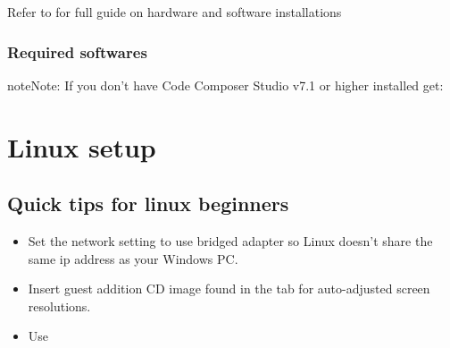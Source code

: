 \documentclass[letterpaper,10pt,english]{sphinxmanual}
\begin{document}
Refer to  for full guide on hardware and software installations


\subsubsection{Required softwares}
\label{\detokenize{Radar information:required-softwares}}




\begin{sphinxadmonition}{note}{Note:}
If you don’t have Code Composer Studio v7.1 or higher installed get:
\end{sphinxadmonition}



\section{Linux setup}
\label{\detokenize{Linux setup:linux-setup}}\label{\detokenize{Linux setup::doc}}





\subsection{Quick tips for linux beginners}
\label{\detokenize{Linux setup:quick-tips-for-linux-beginners}}\begin{itemize}
\item {} 
Set the network setting to use bridged adapter so Linux doesn’t share the same ip address as your Windows PC.

\item {} 
Insert guest addition CD image found in the  tab for auto-adjusted screen resolutions.

\item {} 
Use 

\end{itemize}
\end{document}
